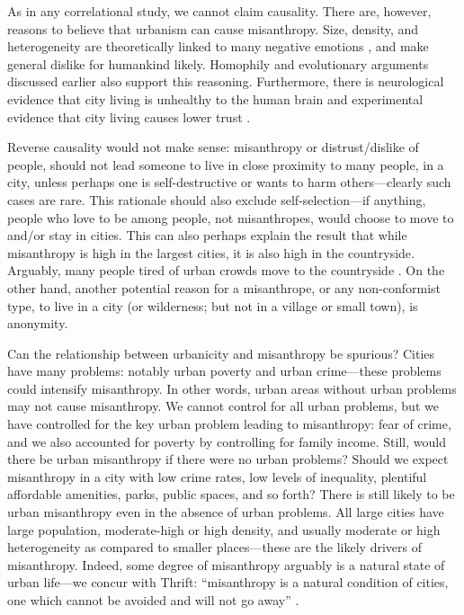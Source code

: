 \documentclass[11pt, letterpaper]{article}
\begin{document}
\begin{spacing}{1.4}
As in any correlational study, we cannot claim causality. There are, however,
reasons to believe that urbanism can cause misanthropy. Size, density, and
heterogeneity are theoretically linked to many negative emotions
\citep{wirth38}, and make general dislike for humankind likely. Homophily and
evolutionary arguments discussed earlier also support this reasoning. {Furthermore, there is neurological evidence that city living is unhealthy to the human brain \citep{lederbogen11} and experimental evidence that city living causes lower trust \citep{milgram70}.}

Reverse causality would not make sense: misanthropy or distrust/dislike of people, should
not lead someone to live in close proximity to many people, in a  city, unless
perhaps one is self-destructive or wants to harm others---clearly such cases are rare. 
 This rationale should also exclude self-selection---if anything, people who
 love to be among  people, not misanthropes, would choose to move to and/or stay
 in cities. This can also perhaps explain the result that while misanthropy is high in the largest
cities, it is also high in the 
countryside. Arguably, many people tired of urban crowds move to the
countryside \citep[e.g.,][]{deweyWP17nov23}.
 On the other hand, {another potential reason for a misanthrope, or any
   non-conformist type, to live in a city (or wilderness; but not in a village or
   small town), is anonymity.}

Can the relationship between urbanicity and misanthropy be spurious? Cities have
many problems: notably urban poverty and urban crime---these problems could
intensify misanthropy. In other words, urban areas without urban problems may 
not cause misanthropy.  We cannot control for all urban problems, but we have
controlled for the key urban problem leading to misanthropy: fear of crime, and
we also accounted for poverty by controlling for family income. 
 Still, would there be urban misanthropy if there were no urban problems? Should
we expect misanthropy in a city with low crime rates, low levels of inequality,
plentiful affordable amenities, parks, public spaces, and so forth? There is
still likely to be urban misanthropy even in the absence of urban problems.  
All large cities have large population, moderate-high or high
density, and usually moderate or high heterogeneity as compared to smaller
places---these are the likely drivers of misanthropy. Indeed, some degree of
misanthropy arguably is a natural state of urban life---we concur with Thrift: ``misanthropy is a natural
condition of cities, one which cannot be avoided and will not go away'' \citep{thrift05}.
%



\end{spacing}
\end{document}
